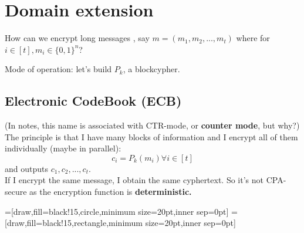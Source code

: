\section{Domain extension}

How can we encrypt long messages , say $m=(m_{1}, m_{2}, ..., m_{t})$ where for $i \in [t], m_{i} \in \{0,1\}^{n} $?

Mode of operation: let's build $P_{k}$, a blockcypher.

\subsection{Electronic CodeBook (ECB)}

(In notes, this name is associated with CTR-mode, or \textbf{counter mode}, but
why?)\\
The principle is that I have many blocks of information and I encrypt all of
them individually (maybe in parallel):
\[
    c_{i}=P_{k}(m_{i}) \forall i \in [t]
\]
and outputs $c_{1}, c_{2}, ..., c_{t}$.\\

If I encrypt the same message, I obtain the same cyphertext. So it's not
CPA-secure as the encryption function is \textbf{deterministic.}

\begin{preview}
    =[draw,fill=black!15,circle,minimum size=20pt,inner sep=0pt]
    =[draw,fill=black!15,rectangle,minimum size=20pt,inner sep=0pt]
    \centering
\end{preview}

